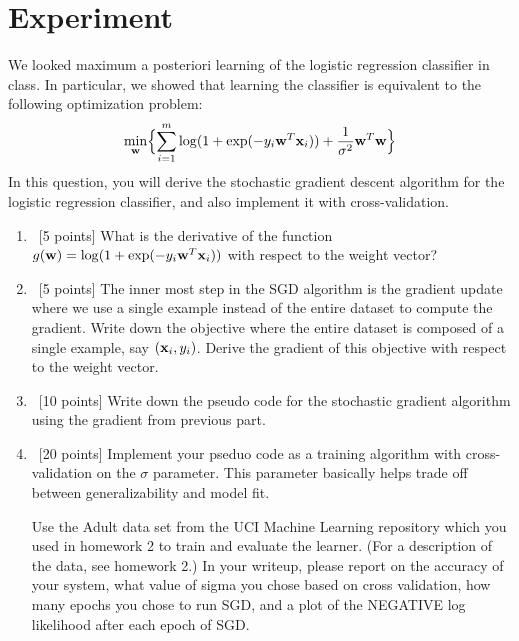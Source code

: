 \section{Experiment}
\label{sec:experiment}

We looked maximum a posteriori learning of the logistic regression classifier in class. In particular, we showed that learning the classifier is equivalent to the following optimization problem:
\[
\min_{{\bf w}} \Bigl\{\sum_{i=1}^m \log(1+ \exp(-y_i{\bf w}^T{\bf x}_i)) + \frac{1}{\sigma^2}{\bf w}^T{\bf w}\Bigr\}
\]
In this question, you will derive the stochastic gradient descent algorithm for the logistic
regression classifier, and also implement it with cross-validation. 

\begin{enumerate}
\item ~[5 points] What is the derivative of the function $g({\bf w}) = \log(1+ \exp(-y_i{\bf w}^T{\bf x}_i))$ with respect to the weight vector?




\item ~[5 points] The inner most step in the SGD algorithm is the gradient update where we use a single example instead of the entire dataset to compute the gradient. Write down the objective where the entire dataset is composed of a single example, say $({\bf x}_i, y_i)$. Derive the gradient of this objective with respect to the weight vector.



\item ~[10 points] Write down the pseudo code for the stochastic gradient algorithm using the gradient from previous part.



\item ~[20 points] Implement your pseduo code as a training algorithm with
  cross-validation on the $\sigma$ parameter.  This parameter
  basically helps trade off between generalizability and model fit.  

  Use the Adult data set from the UCI Machine Learning repository which you used in homework 2 to train and evaluate the learner. (For a description of the data, see homework 2.) In your writeup,
  please report on the accuracy of your system, what value of sigma
  you chose based on cross validation, how many epochs you chose to
  run SGD, and a plot of the NEGATIVE log likelihood after each epoch
  of SGD.



\end{enumerate}




